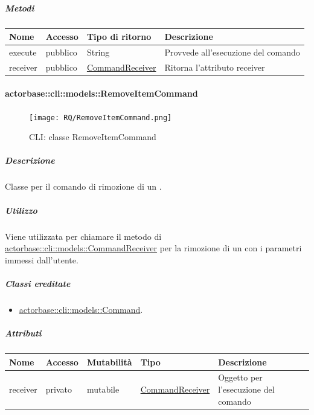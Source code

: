 \documentclass{scalatekids-article}
\begin{document}
\subparagraph{Metodi}

\begin{tabular}{| l | l | l | l |}
  \hline
  Nome & Accesso & Tipo di ritorno & Descrizione\\
  \hline
  execute & pubblico & String & Provvede all'esecuzione del comando\\
  \hline
  receiver & pubblico & \hyperref[sec:actorbase::cli::models::CommandReceiver]{CommandReceiver} & Ritorna l'attributo receiver\\
  \hline
\end{tabular}

\paragraph{actorbase::cli::models::RemoveItemCommand}
\label{sec:actorbase::cli::models::RemoveItemCommand}

\begin{figure}[H]
  \begin{center}
    \texttt{[image: RQ/RemoveItemCommand.png]}
    \caption{CLI: classe RemoveItemCommand}
  \end{center}
\end{figure}

\subparagraph{Descrizione}

Classe per il comando di rimozione di un .

\subparagraph{Utilizzo}

Viene utilizzata per chiamare il metodo di
\hyperref[sec:actorbase::cli::models::CommandReceiver]{actorbase::cli::models::CommandReceiver} per la rimozione di un 
con i parametri immessi dall'utente.

\subparagraph{Classi ereditate}

\begin{itemize}
\item \hyperref[sec:actorbase::cli::models::Command]{actorbase::cli::models::Command}.
\end{itemize}

\subparagraph{Attributi}

\begin{tabular}{| p{1cm} | p{1.5cm} | p{2cm} | p{4cm} | p{8.5cm} |}
  \hline
  Nome & Accesso & Mutabilità & Tipo & Descrizione\\
  \hline
  receiver & privato & mutabile & \hyperref[sec:actorbase::cli::models::CommandReceiver]{CommandReceiver} & Oggetto per l'esecuzione del comando\\
  \hline
\end{tabular}
\end{document}
